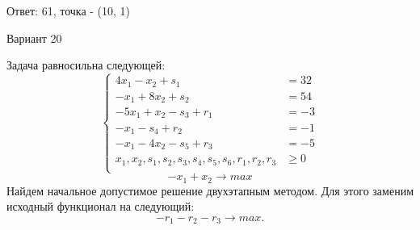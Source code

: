 \documentclass{article}%
\begin{document}
\begin{flushright}%
Ответ: 61, точка {-} (10, 1)%
\end{flushright}%
\newpage%
\begin{center}%
\begin{Huge}%
Вариант 20%
\end{Huge}%
\end{center}%
Задача равносильна следующей: %
\[%
\left\{\begin{aligned}4x_{1}-x_{2}+s_{1} & =32 \\-x_{1}+8x_{2}+s_{2} & =54 \\-5x_{1}+x_{2}-s_{3}+r_{1} & =-3 \\-x_{1}-s_{4}+r_{2} & =-1 \\-x_{1}-4x_{2}-s_{5}+r_{3} & =-5 \\x_{1},x_{2},s_{1},s_{2},s_{3},s_{4},s_{5},s_{6},r_{1},r_{2},r_{3} & \ge 0 \\ \end{aligned}\right.%
\]%
\[%
-x_{1}+x_{2}  \to max%
\]%
Найдем начальное допустимое решение двухэтапным методом. Для этого заменим исходный функционал на следующий: %
\[%
-r_{1}-r_{2}-r_{3}\to max.%
\]%
\end{document}
